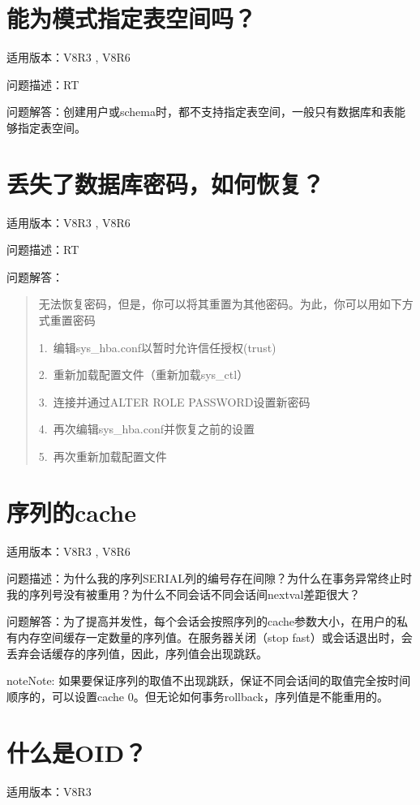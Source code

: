 \documentclass[a4,10pt,oneside,english]{sphinxmanual}
\begin{document}
\section{能为模式指定表空间吗？}
\label{\detokenize{sql:id13}}
适用版本：V8R3 , V8R6

问题描述：RT

问题解答：创建用户或schema时，都不支持指定表空间，一般只有数据库和表能够指定表空间。


\section{丢失了数据库密码，如何恢复？}
\label{\detokenize{sql:id14}}
适用版本：V8R3 , V8R6

问题描述：RT

问题解答：
\begin{quote}

无法恢复密码，但是，你可以将其重置为其他密码。为此，你可以用如下方式重置密码

1. 编辑sys\_hba.conf以暂时允许信任授权(trust)

2. 重新加载配置文件（重新加载sys\_ctl）

3. 连接并通过ALTER ROLE PASSWORD设置新密码

4. 再次编辑sys\_hba.conf并恢复之前的设置

5. 再次重新加载配置文件
\end{quote}


\section{序列的cache}
\label{\detokenize{sql:cache}}
适用版本：V8R3 , V8R6

问题描述：为什么我的序列SERIAL列的编号存在间隙？为什么在事务异常终止时我的序列号没有被重用？为什么不同会话不同会话间nextval差距很大？

问题解答：为了提高并发性，每个会话会按照序列的cache参数大小，在用户的私有内存空间缓存一定数量的序列值。在服务器关闭（stop fast）或会话退出时，会丢弃会话缓存的序列值，因此，序列值会出现跳跃。

\begin{sphinxadmonition}{note}{Note:}
如果要保证序列的取值不出现跳跃，保证不同会话间的取值完全按时间顺序的，可以设置cache 0。但无论如何事务rollback，序列值是不能重用的。
\end{sphinxadmonition}


\section{什么是OID？}
\label{\detokenize{sql:oid}}
适用版本：V8R3
\end{document}
